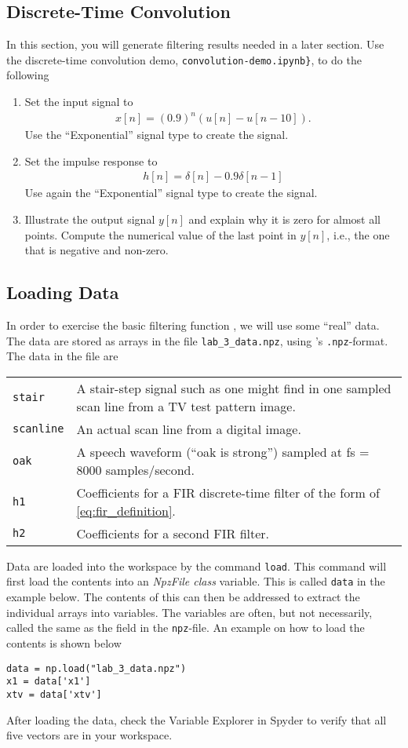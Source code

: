 \subsection{Discrete-Time Convolution}
In this section, you will generate filtering results needed in a later section. Use the discrete-time convolution demo, \verb|convolution-demo.ipynb}|, to do the following
\begin{enumerate}[1)]
	\item Set the input signal to
	\begin{align*}
		x[n] = (0.9)^n (u[n]-u[n-10]). 
	\end{align*}
	Use the “Exponential” signal type to create the signal.
	
	\item Set the impulse response to  
	\begin{align*}
		h[n] = \delta[n] - 0.9 \delta[n-1]
	\end{align*}
	Use again the “Exponential” signal type to create the signal.
	
	\item Illustrate the output signal $y[n]$ and explain why it is zero for almost all points. 
	Compute the numerical value of the last point in $y[n]$, i.e., the one that is negative and non-zero.
\end{enumerate}


\subsection{Loading Data}
In order to exercise the basic filtering function , we will use some “real” data. 
The data are stored as \numpy arrays in the file \verb|lab_3_data.npz|, using \numpy's \verb|.npz|-format. 
The data in the file are
\begin{tabular}{ll}
	\verb|stair|  & A stair-step signal such as one might find in one sampled scan line from a TV test pattern
image. \\
	\verb|scanline| & An actual scan line from a digital image. \\
	\verb|oak|  & A speech waveform (“oak is strong”) sampled at fs = 8000 samples/second. \\
	\verb|h1|  & Coefficients for a FIR discrete-time filter of the form of \eqref{eq:fir_definition}. \\
	\verb|h2|  & Coefficients for a second FIR filter.
\end{tabular}
Data are loaded into the workspace by the \numpy command \verb|load|. This command will first load the contents into an \emph{NpzFile class} variable. This is called \verb|data| in the example below.
The contents of this can then be addressed to extract the individual \numpy arrays into variables. 
The variables are often, but not necessarily, called the same as the field in the \verb|npz|-file.
An example on how to load the contents is shown below
\begin{lstlisting}[style=pythonstyle]
data = np.load("lab_3_data.npz")
x1 = data['x1']
xtv = data['xtv']
\end{lstlisting}
After loading the data, check the Variable Explorer in Spyder to verify that all five vectors are in your workspace.


